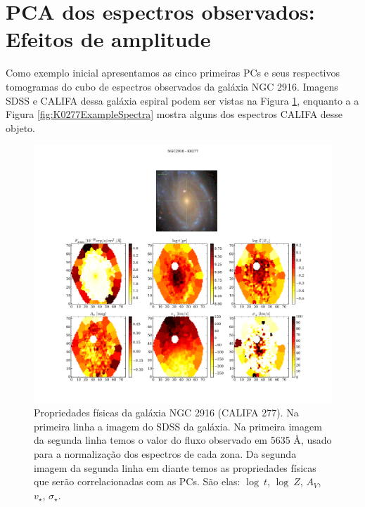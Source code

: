\section{PCA dos espectros observados: Efeitos de amplitude}
\label{sec:PCAaplic:norm}

Como exemplo inicial apresentamos as cinco primeiras PCs e seus respectivos tomogramas do cubo de espectros observados
da galáxia NGC 2916. Imagens SDSS e CALIFA dessa galáxia espiral podem ser vistas na Figura \ref{fig:K0277apresent},
enquanto a a Figura \ref{fig:K0277ExampleSpectra} mostra alguns dos espectros CALIFA desse objeto. 

\begin{figure}
    \includegraphics[width=1.\textwidth]{figuras/K0277-apresent.pdf}
    \caption[Propriedades f\'isicas da gal\'axia NGC 2916 (CALIFA 277).]
    {Propriedades físicas da galáxia NGC 2916 (CALIFA 277). Na primeira linha a imagem do SDSS da galáxia. Na primeira
    imagem da segunda linha temos o valor do fluxo observado em 5635 \AA, usado para a normalização dos espectros de
    cada zona. Da segunda imagem da segunda linha em diante temos as propriedades físicas que serão correlacionadas com
    as PCs. São elas: $\log\ t$, $\log\ Z$, $A_V$, $v_{\star}$, $\sigma_{\star}$.}
    \label{fig:K0277apresent}
\end{figure}

